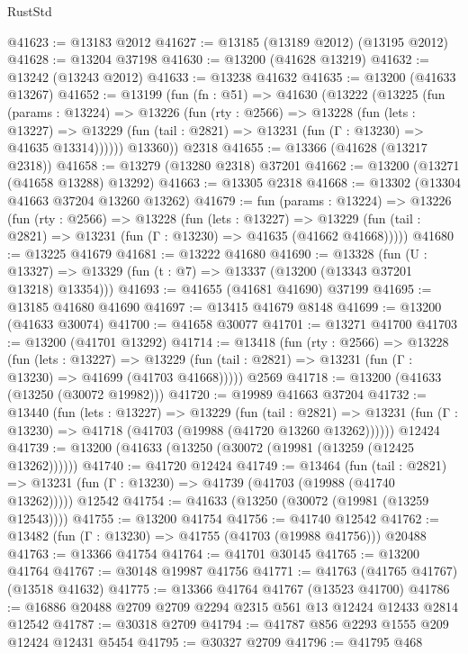 \begin{lexlean}{RustStd}
\begin{coremodule}
@41623 := @13183 @2012
@41627 := @13185 (@13189 @2012) (@13195 @2012)
@41628 := @13204 @37198
@41630 := @13200 (@41628 @13219)
@41632 := @13242 (@13243 @2012)
@41633 := @13238 @41632
@41635 := @13200 (@41633 @13267)
@41652 := @13199
    (fun (fn : @51) =>
    @41630
      (@13222
        (@13225
          (fun (params : @13224) =>
          @13226
            (fun (rty : @2566) =>
            @13228
              (fun (lets : @13227) =>
              @13229 (fun (tail : @2821) => @13231 (fun (Γ : @13230) => @41635 @13314))))))
        @13360))
    @2318
@41655 := @13366 (@41628 (@13217 @2318))
@41658 := @13279 (@13280 @2318) @37201
@41662 := @13200 (@13271 (@41658 @13288) @13292)
@41663 := @13305 @2318
@41668 := @13302 (@13304 @41663 @37204 @13260 @13262)
@41679 := fun (params : @13224) =>
  @13226
    (fun (rty : @2566) =>
    @13228
      (fun (lets : @13227) =>
      @13229 (fun (tail : @2821) => @13231 (fun (Γ : @13230) => @41635 (@41662 @41668)))))
@41680 := @13225 @41679
@41681 := @13222 @41680
@41690 := @13328
    (fun (U : @13327) => @13329 (fun (t : @7) => @13337 (@13200 (@13343 @37201 @13218) @13354)))
@41693 := @41655 (@41681 @41690) @37199
@41695 := @13185 @41680 @41690
@41697 := @13415 @41679 @8148
@41699 := @13200 (@41633 @30074)
@41700 := @41658 @30077
@41701 := @13271 @41700
@41703 := @13200 (@41701 @13292)
@41714 := @13418
    (fun (rty : @2566) =>
    @13228
      (fun (lets : @13227) =>
      @13229 (fun (tail : @2821) => @13231 (fun (Γ : @13230) => @41699 (@41703 @41668)))))
    @2569
@41718 := @13200 (@41633 (@13250 (@30072 @19982)))
@41720 := @19989 @41663 @37204
@41732 := @13440
    (fun (lets : @13227) =>
    @13229
      (fun (tail : @2821) =>
      @13231 (fun (Γ : @13230) => @41718 (@41703 (@19988 (@41720 @13260 @13262))))))
    @12424
@41739 := @13200 (@41633 (@13250 (@30072 (@19981 (@13259 (@12425 @13262))))))
@41740 := @41720 @12424
@41749 := @13464
    (fun (tail : @2821) => @13231 (fun (Γ : @13230) => @41739 (@41703 (@19988 (@41740 @13262)))))
    @12542
@41754 := @41633 (@13250 (@30072 (@19981 (@13259 @12543))))
@41755 := @13200 @41754
@41756 := @41740 @12542
@41762 := @13482 (fun (Γ : @13230) => @41755 (@41703 (@19988 @41756))) @20488
@41763 := @13366 @41754
@41764 := @41701 @30145
@41765 := @13200 @41764
@41767 := @30148 @19987 @41756
@41771 := @41763 (@41765 @41767) (@13518 @41632)
@41775 := @13366 @41764 @41767 (@13523 @41700)
@41786 := @16886 @20488 @2709 @2709 @2294 @2315 @561 @13 @12424 @12433 @2814 @12542
@41787 := @30318 @2709
@41794 := @41787 @856 @2293 @1555 @209 @12424 @12431 @5454
@41795 := @30327 @2709
@41796 := @41795 @468

\end{coremodule}
\end{lexlean}
